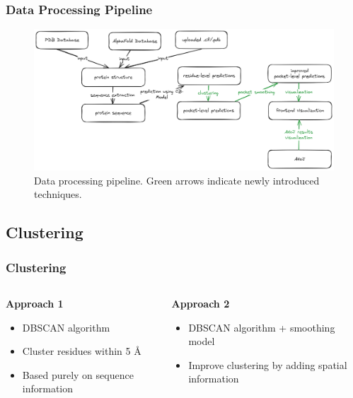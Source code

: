 \documentclass[aspectratio=169]{beamer}
\begin{document}
\begin{frame}
  \frametitle{Data Processing Pipeline}

  \begin{figure}
    \includegraphics[width=\textwidth]{fig/pipeline.png}
    \caption{Data processing pipeline. \textcolor{ITMOdarkgreen}{Green arrows} indicate newly introduced techniques.}
  \end{figure}

\end{frame}

\subsection{Clustering}

\begin{frame}
  \frametitle{Clustering}

  \begin{columns}
    \begin{column}{0.5\textwidth}
      \textbf{Approach 1}
      \begin{itemize}
        \item DBSCAN algorithm
        \item Cluster residues within 5 \AA
        \item Based purely on sequence information
      \end{itemize}
    \end{column}
    \begin{column}{0.5\textwidth}
      \textbf{Approach 2}
      \begin{itemize}
        \item DBSCAN algorithm + smoothing model
        \item Improve clustering by adding spatial information
      \end{itemize}
    \end{column}
  \end{columns}

\end{frame}
\end{document}

